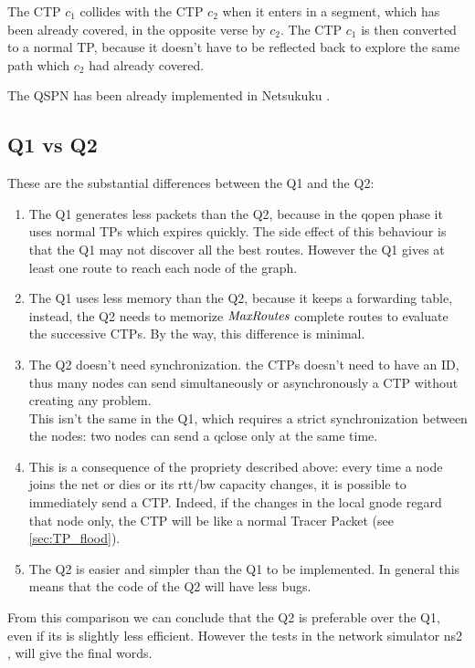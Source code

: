 \documentclass[a4paper]{article}
\begin{document}
The CTP $c_1$ collides with the CTP $c_2$ when it enters in a segment, which
has been already covered, in the opposite verse by $c_2$. The CTP $c_1$ is
then converted to a normal TP, because it doesn't have to be reflected back to
explore the same path which $c_2$ had already covered.

The QSPN has been already implemented in Netsukuku \cite{ntksite}.

\subsection{Q1 vs Q2}
These are the substantial differences between the Q1 and the Q2:
\begin{enumerate}
	\item The Q1 generates less packets than the Q2, because in the qopen
		phase it uses normal TPs which expires quickly. The side
		effect of this behaviour is that the Q1 may not discover all
		the best routes. However the Q1 gives at least one route to
		reach each node of the graph.

	\item The Q1 uses less memory than the Q2, because it keeps a
		forwarding table, instead, the Q2 needs to memorize 
		$\emph{MaxRoutes}$ complete routes to evaluate the successive
		CTPs. By the way, this difference is minimal.

	\item The Q2 doesn't need synchronization. the CTPs doesn't need to
		have an ID, thus many nodes can send simultaneously or
		asynchronously a CTP without creating any problem.\\
		This isn't the same in the Q1, which requires a strict
		synchronization between the nodes: two nodes can send 
		a qclose only at the same time.
	
	\item This is a consequence of the propriety described above: every
		time a node joins the net or dies or its rtt/bw capacity
		changes, it is possible to immediately send a CTP. Indeed, if
		the changes in the local gnode regard that node only, the CTP
		will be like a normal Tracer Packet (see \ref{sec:TP_flood}).

	\item The Q2 is easier and simpler than the Q1 to be implemented. In
		general this means that the code of the Q2 will have less
		bugs.
\end{enumerate}

From this comparison we can conclude that the Q2 is preferable over the Q1,
even if its is slightly less efficient.
However the tests in the network simulator ns2 \cite{ns2}, will give the final
words.
\end{document}
